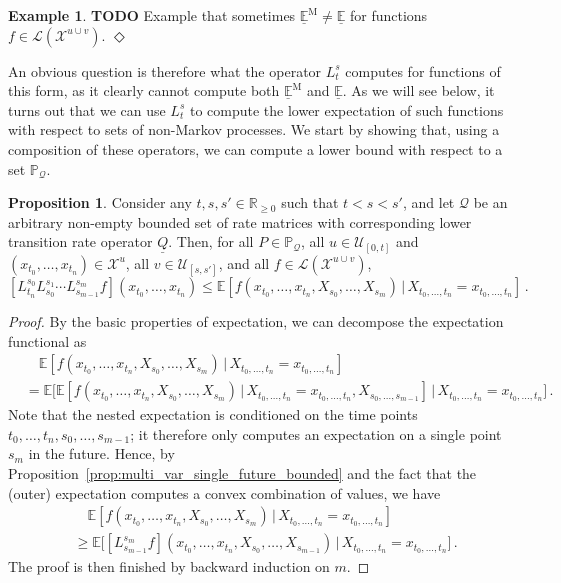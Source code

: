 \documentclass[10pt]{paper}
\theoremstyle{definition}
\newtheorem{exmp}{Example}%
\newtheorem{proposition}[theorem]{Proposition}
\newcommand{\reals}{\mathbb{R}}
\newcommand{\realsnonneg}{\reals_{\geq 0}}
\newcommand{\states}{\mathcal{X}}
\newcommand{\processes}{\mathbb{P}}
\newcommand{\gambles}{\mathcal{L}}
\newcommand{\rateset}{\mathcal{Q}}
\newcommand{\lrate}{\underline{Q}}
\newcommand{\exampleend}{\hfill$\Diamond$}
\begin{document}
\begin{exmp}
{\bf TODO} Example that sometimes $\underline{\mathbb{E}}^\mathrm{M}\neq \underline{\mathbb{E}}$ for functions $f\in\gambles(\states^{u\cup v})$.
\exampleend
\end{exmp}

An obvious question is therefore what the operator $L_t^s$ computes for functions of this form, as it clearly cannot compute both $\underline{\mathbb{E}}^\mathrm{M}$ and $\underline{\mathbb{E}}$. As we will see below, it turns out that we can use $L_t^s$ to compute the lower expectation of such functions with respect to sets of non-Markov processes. We start by showing that, using a composition of these operators, we can compute a lower bound with respect to a set $\processes_\rateset$.
\begin{proposition}\label{prop:multivar_bounded}
Consider any $t,s,s'\in\realsnonneg$ such that $t<s<s'$, and let $\rateset$ be an arbitrary non-empty bounded set of rate matrices with corresponding lower transition rate operator $\lrate$. Then, for all $P\in\processes_\rateset$, all $u\in\mathcal{U}_{[0,t]}$ and $(x_{t_0},\ldots,x_{t_n})\in\states^u$, all $v\in\mathcal{U}_{[s,s']}$, and all $f\in\gambles(\states^{u\cup v})$,
\begin{equation*}
\left[L_{t_n}^{s_0}L_{s_0}^{s_1}\cdots L_{s_{m-1}}^{s_m}f\right](x_{t_0},\ldots,x_{t_n}) \leq \mathbb{E}[f(x_{t_0},\ldots,x_{t_n},X_{s_0},\ldots,X_{s_m})\,\vert\,X_{t_0,\ldots,t_n}=x_{t_0,\ldots,t_n}]\,.
\end{equation*}
\end{proposition}
\begin{proof}
By the basic properties of expectation, we can decompose the expectation functional as
\begin{align*}
 &\quad \mathbb{E}[f(x_{t_0},\ldots,x_{t_n},X_{s_0},\ldots,X_{s_m})\,\vert\,X_{t_0,\ldots,t_n}=x_{t_0,\ldots,t_n}] \\
 &= \mathbb{E}\bigl[\mathbb{E}[f(x_{t_0},\ldots,x_{t_n},X_{s_0},\ldots,X_{s_m})\,\vert\,X_{t_0,\ldots,t_n}=x_{t_0,\ldots,t_n},X_{s_0,\ldots,s_{m-1}}]\,\big\vert\,X_{t_0,\ldots,t_n}=x_{t_0,\ldots,t_n}\bigr]\,.
\end{align*}
Note that the nested expectation is conditioned on the time points $t_0,\ldots,t_n,s_0,\ldots,s_{m-1}$; it therefore only computes an expectation on a single point $s_m$ in the future. Hence, by Proposition~\ref{prop:multi_var_single_future_bounded} and the fact that the (outer) expectation computes a convex combination of values, we have
\begin{align*}
&\quad\mathbb{E}[f(x_{t_0},\ldots,x_{t_n},X_{s_0},\ldots,X_{s_m})\,\vert\,X_{t_0,\ldots,t_n}=x_{t_0,\ldots,t_n}] \\
 &\geq \mathbb{E}\bigl[[L_{s_{m-1}}^{s_m}f](x_{t_0},\ldots,x_{t_n},X_{s_0},\ldots,X_{s_{m-1}})\,\vert\,X_{t_0,\ldots,t_n}=x_{t_0,\ldots,t_n}\bigr]\,.
\end{align*}
The proof is then finished by backward induction on $m$.
\end{proof}
\end{document}
